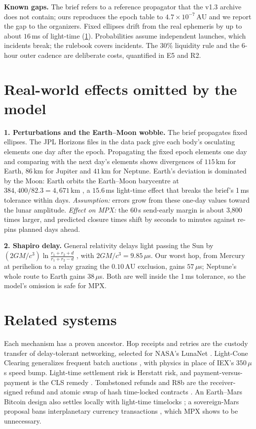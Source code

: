 \documentclass[11pt]{article}
\theoremstyle{definition}
\theoremstyle{remark}
\newcommand{\AU}{\,\mathrm{AU}}
\newcommand{\km}{\,\mathrm{km}}
\begin{document}
\textbf{Known gaps.} The brief refers to a reference propagator that the v1.3 archive does not contain; ours reproduces the epoch table to $4.7\times10^{-7}\AU$ and we report the gap to the organizers. Fixed ellipses drift from the real ephemeris by up to about $16$\,ms of light-time (\cref{sec:effects}). Probabilities assume independent launches, which incidents break; the rulebook covers incidents. The $30\%$ liquidity rule and the 6-hour outer cadence are deliberate costs, quantified in E5 and R2.

\section{Real-world effects omitted by the model}\label{sec:effects}
\textbf{1. Perturbations and the Earth--Moon wobble.} The brief propagates fixed ellipses. The JPL Horizons files in the data pack \cite{horizons} give each body's osculating elements one day after the epoch. Propagating the fixed epoch elements one day and comparing with the next day's elements shows divergences of $115\km$ for Earth, $86\km$ for Jupiter and $41\km$ for Neptune. Earth's deviation is dominated by the Moon: Earth orbits the Earth--Moon barycentre at $384{,}400/82.3 = 4{,}671\km$ \cite{folkner2009}, a $15.6$\,ms light-time effect that breaks the brief's 1\,ms tolerance within days. \emph{Assumption:} errors grow from these one-day values toward the lunar amplitude. \emph{Effect on MPX:} the 60\,s send-early margin is about 3{,}800 times larger, and predicted closure times shift by seconds to minutes against re-pins planned days ahead.

\textbf{2. Shapiro delay.} General relativity delays light passing the Sun by $(2GM/c^3)\ln\frac{r_1+r_2+d}{r_1+r_2-d}$ \cite{shapiro1964}, with $2GM/c^3=9.85\,\mu$s. Our worst hop, from Mercury at perihelion to a relay grazing the $0.10\AU$ exclusion, gains $57\,\mu$s; Neptune's whole route to Earth gains $38\,\mu$s. Both are well inside the 1\,ms tolerance, so the model's omission is safe for MPX.

\section{Related systems}\label{sec:related}
Each mechanism has a proven ancestor. Hop receipts and retries are the custody transfer of delay-tolerant networking, selected for NASA's LunaNet \cite{cerf,rfc9171}. Light-Cone Clearing generalizes frequent batch auctions \cite{budish2015}, with physics in place of IEX's $350\,\mu$s speed bump. Light-time settlement risk is Herstatt risk, and payment-versus-payment is the CLS remedy \cite{bisfx}. Tombstoned refunds and R8b are the receiver-signed refund and atomic swap of hash time-locked contracts \cite{htlc}. An Earth--Mars Bitcoin design also settles locally with light-time timelocks \cite{puente}; a sovereign-Mars proposal bans interplanetary currency transactions \cite{haqq}, which MPX shows to be unnecessary.
\end{document}
